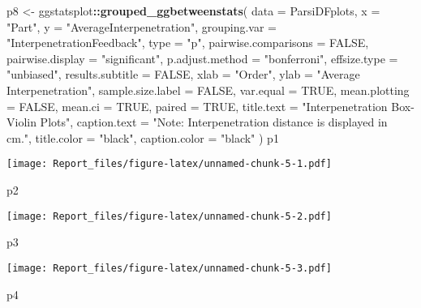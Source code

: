 \documentclass[
]{article}
\newenvironment{Shaded}{\begin{snugshade}}{\end{snugshade}}
\newcommand{\DataTypeTok}[1]{\textcolor[rgb]{0.13,0.29,0.53}{#1}}
\newcommand{\KeywordTok}[1]{\textcolor[rgb]{0.13,0.29,0.53}{\textbf{#1}}}
\newcommand{\NormalTok}[1]{#1}
\newcommand{\OperatorTok}[1]{\textcolor[rgb]{0.81,0.36,0.00}{\textbf{#1}}}
\newcommand{\OtherTok}[1]{\textcolor[rgb]{0.56,0.35,0.01}{#1}}
\newcommand{\StringTok}[1]{\textcolor[rgb]{0.31,0.60,0.02}{#1}}
\begin{document}
\begin{Shaded}
\begin{Highlighting}[]
\NormalTok{p8 <-}\StringTok{ }\NormalTok{ggstatsplot}\OperatorTok{::}\KeywordTok{grouped_ggbetweenstats}\NormalTok{(}
  \DataTypeTok{data =}\NormalTok{ ParsiDFplots,}
  \DataTypeTok{x =} \StringTok{"Part"}\NormalTok{,}
  \DataTypeTok{y =} \StringTok{"AverageInterpenetration"}\NormalTok{,}
  \DataTypeTok{grouping.var =} \StringTok{"InterpenetrationFeedback"}\NormalTok{,}
  \DataTypeTok{type =} \StringTok{"p"}\NormalTok{,}
  \DataTypeTok{pairwise.comparisons =} \OtherTok{FALSE}\NormalTok{,}
  \DataTypeTok{pairwise.display =} \StringTok{"significant"}\NormalTok{,}
  \DataTypeTok{p.adjust.method =} \StringTok{"bonferroni"}\NormalTok{,}
  \DataTypeTok{effsize.type =} \StringTok{"unbiased"}\NormalTok{,}
  \DataTypeTok{results.subtitle =} \OtherTok{FALSE}\NormalTok{,}
  \DataTypeTok{xlab =} \StringTok{"Order"}\NormalTok{,}
  \DataTypeTok{ylab =} \StringTok{"Average Interpenetration"}\NormalTok{,}
  \DataTypeTok{sample.size.label =} \OtherTok{FALSE}\NormalTok{,}
  \DataTypeTok{var.equal =} \OtherTok{TRUE}\NormalTok{,}
  \DataTypeTok{mean.plotting =} \OtherTok{FALSE}\NormalTok{,}
  \DataTypeTok{mean.ci =} \OtherTok{TRUE}\NormalTok{,}
  \DataTypeTok{paired =} \OtherTok{TRUE}\NormalTok{,}
  \DataTypeTok{title.text =} \StringTok{"Interpenetration Box-Violin Plots"}\NormalTok{,}
  \DataTypeTok{caption.text =} \StringTok{"Note: Interpenetration distance is displayed in cm."}\NormalTok{,}
  \DataTypeTok{title.color =} \StringTok{"black"}\NormalTok{,}
  \DataTypeTok{caption.color =} \StringTok{"black"}
\NormalTok{  ) }
\NormalTok{p1}
\end{Highlighting}
\end{Shaded}

\texttt{[image: Report\_files/figure-latex/unnamed-chunk-5-1.pdf]}

\begin{Shaded}
\begin{Highlighting}[]
\NormalTok{p2}
\end{Highlighting}
\end{Shaded}

\texttt{[image: Report\_files/figure-latex/unnamed-chunk-5-2.pdf]}

\begin{Shaded}
\begin{Highlighting}[]
\NormalTok{p3 }
\end{Highlighting}
\end{Shaded}

\texttt{[image: Report\_files/figure-latex/unnamed-chunk-5-3.pdf]}

\begin{Shaded}
\begin{Highlighting}[]
\NormalTok{p4}
\end{Highlighting}
\end{Shaded}
\end{document}
